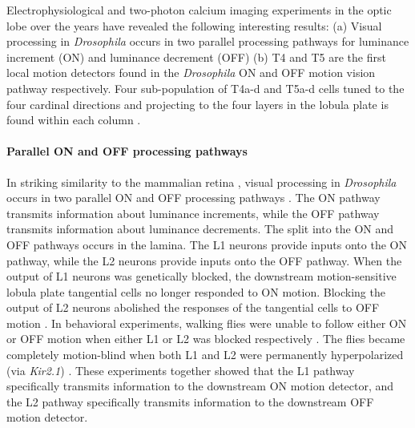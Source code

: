 Electrophysiological and two-photon calcium imaging experiments in the optic lobe over the years have revealed the following interesting results: (a) Visual processing in \textit{Drosophila} occurs in two parallel processing pathways for luminance increment (ON) and luminance decrement (OFF) \parencite{Joesch2010, Joesch2013, Strother2014, Eichner2011, Behnia2014, Shinomiya2014} (b) T4 and T5 are the first local motion detectors found in the \textit{Drosophila} ON and OFF motion vision pathway respectively. Four sub-population of T4a-d and T5a-d cells tuned to the four cardinal directions and projecting to the four layers in the lobula plate is found within each column \parencite{Maisak2013}. 


\paragraph{Parallel ON and OFF processing pathways}
In striking similarity to the mammalian retina \parencite{Masland2012}, visual processing in \textit{Drosophila} occurs in two parallel ON and OFF processing pathways \parencite{Borst2015}. The ON pathway transmits information about luminance increments, while the OFF pathway transmits information about luminance decrements. The split into the ON and OFF pathways occurs in the lamina. The L1 neurons provide inputs onto the ON pathway, while the L2 neurons provide inputs onto the OFF pathway. When the output of L1 neurons was genetically blocked, the downstream motion-sensitive lobula plate tangential cells no longer responded to ON motion. Blocking the output of L2 neurons abolished the responses of the tangential cells to OFF motion \parencite{Joesch2010}. In behavioral experiments, walking flies were unable to follow either ON or OFF motion when either L1 or L2 was blocked respectively \parencite{Clark2011, Maisak2013}. The flies became completely motion-blind when both L1 and L2 were permanently hyperpolarized (via \textit{Kir2.1}) \parencite{Tuthill2013, Bahl2013}. These experiments together showed that the L1 pathway specifically transmits information to the downstream ON motion detector, and the L2 pathway specifically transmits information to the downstream OFF motion detector. 

